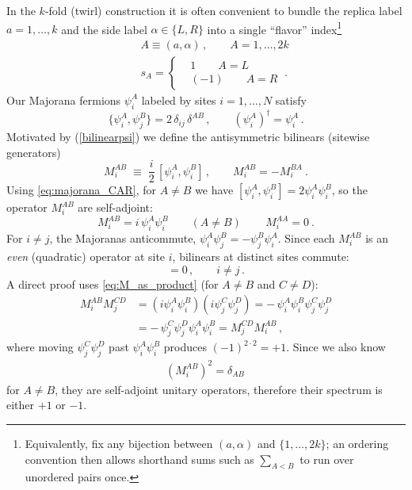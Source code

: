 \documentclass{article}
\theoremstyle{definition}
\newcommand{\nn}{\nonumber}
\begin{document}
    In the $k$-fold (twirl) construction it is often convenient to bundle the
    replica label $a=1,\dots,k$ and the side label $\alpha\in\{L,R\}$ into a
    single ``flavor'' index\footnote{Equivalently, fix any bijection between $(a,
    \alpha)$ and $\{1 , \dots,2k\}$; an ordering convention then allows
    shorthand sums such as $\sum_{A<B}$ to run over unordered pairs once.}
    \begin{eqnarray}
        &&A \equiv (a,\alpha)\,,\qquad A=1,\dots,2k\nn\\
        &&s_A=
        \begin{cases}
             & 1\qquad A=L    \\
             & (-1)\qquad A=R
        \end{cases}\ .
    \end{eqnarray}
    Our Majorana fermions $\psi_{i}^{A}$ labeled by sites $i=1,\dots,N$ satisfy
    \begin{equation}
        \{\psi_{i}^{A},\psi_{j}^{B}\}=2\,\delta_{ij}\,\delta^{AB}\,, \qquad (\psi
        _{i}^{A})^{\dagger}=\psi_{i}^{A}\,. \label{eq:majorana_CAR}
    \end{equation}
    Motivated by (\ref{bilinearpsi}) we define the antisymmetric bilinears (sitewise
    generators)
    \begin{equation}
        M_{i}^{AB}\;\equiv\;\frac{i}{2}\,[\psi_{i}^{A},\psi_{i}^{B}]\,,\qquad M_{i}
        ^{AB}=-M_{i}^{BA}\ . \label{eq:def_M}
    \end{equation}
    Using \eqref{eq:majorana_CAR}, for $A\neq B$ we have $[\psi_{i}^{A},\psi_{i}^{B}
    ]=2\psi_{i}^{A}\psi_{i}^{B}$, so the operator $M^{AB}_{i}$ are self-adjoint:
    \begin{equation}
        \boxed{ M_i^{AB}= i\,\psi_i^A\psi_i^B \qquad (A\neq B)\,\qquad M_i^{AA}=0}
        \ . \label{eq:M_as_product}
    \end{equation}
    For $i\neq j$, the Majoranas anticommute, $\psi_{i}^{A}\psi_{j}^{B}=-\psi_{j}
    ^{B}\psi_{i}^{A}$. Since each $M_{i}^{AB}$ is an \emph{even} (quadratic) operator
    at site $i$, bilinears at distinct sites commute:
    \begin{equation}
        [M_{i}^{AB},M_{j}^{CD}] = 0\,,\qquad i\neq j\,. \label{eq:M_commute_different_sites}
    \end{equation}
    A direct proof uses \eqref{eq:M_as_product} (for $A\neq B$ and $C\neq D$):
    \begin{align}
        M_{i}^{AB}M_{j}^{CD} & = (i\psi_{i}^{A}\psi_{i}^{B})(i\psi_{j}^{C}\psi_{j}^{D}) = -\,\psi_{i}^{A}\psi_{i}^{B}\psi_{j}^{C}\psi_{j}^{D}\nonumber \\
                             & = -\,\psi_{j}^{C}\psi_{j}^{D}\psi_{i}^{A}\psi_{i}^{B}= M_{j}^{CD}M_{i}^{AB}\,,
    \end{align}
    where moving $\psi_{j}^{C}\psi_{j}^{D}$ past $\psi_{i}^{A}\psi_{i}^{B}$ produces
    $(-1)^{2\cdot 2}=+1$. Since we also know
    \begin{eqnarray}
        (M^{AB}_i)^2=\delta_{AB}\,
    \end{eqnarray}
    for $A\neq B$, they are self-adjoint unitary operators, therefore their
    spectrum is either $+1$ or $-1$.
\end{document}
